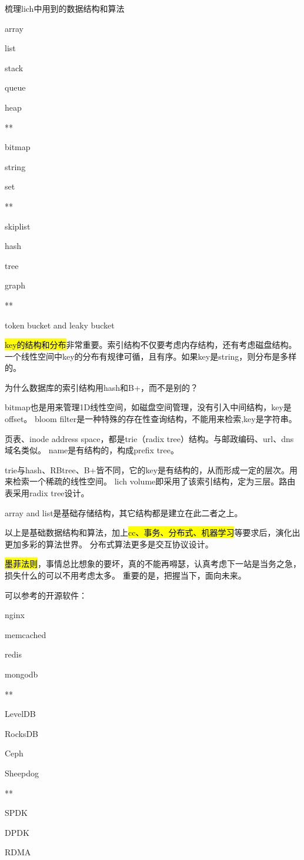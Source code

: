 \hrulefill

梳理lich中用到的数据结构和算法
\begin{enumbox}
\item array
\item list
\item stack
\item queue
\item heap
\item ***
\item bitmap
\item string
\item set
\item ***
\item skiplist
\item hash
\item tree
\item graph
\item ***
\item token bucket and leaky bucket
\end{enumbox}

\hl{key的结构和分布}非常重要。索引结构不仅要考虑内存结构，还有考虑磁盘结构。
一个线性空间中key的分布有规律可循，且有序。如果key是string，则分布是多样的。

为什么数据库的索引结构用hash和B+，而不是别的？

\hrulefill

bitmap也是用来管理1D线性空间，如磁盘空间管理，没有引入中间结构，key是offset。
bloom filter是一种特殊的存在性查询结构，不能用来检索,key是字符串。

页表、inode address space，都是trie（radix tree）结构。与邮政编码、url、dns域名类似。
name是有结构的，构成prefix tree。

trie与hash、RBtree、B+皆不同，它的key是有结构的，从而形成一定的层次。用来检索一个稀疏的线性空间。
lich volume即采用了该索引结构，定为三层。路由表采用radix tree设计。

array and list是基础存储结构，其它结构都是建立在此二者之上。

\hrulefill

以上是基础数据结构和算法，加上\hl{cc、事务、分布式、机器学习}等要求后，演化出更加多彩的算法世界。
分布式算法更多是交互协议设计。

\hl{墨菲法则}，事情总比想象的要坏，真的不能再嘚瑟，认真考虑下一站是当务之急，损失什么的可以不用考虑太多。
重要的是，把握当下，面向未来。

可以参考的开源软件：
\begin{enumbox}
\item nginx
\item memcached
\item redis
\item mongodb
\item ***
\item LevelDB
\item RocksDB
\item Ceph
\item Sheepdog
\item ***
\item SPDK
\item DPDK
\item RDMA
\end{enumbox}

